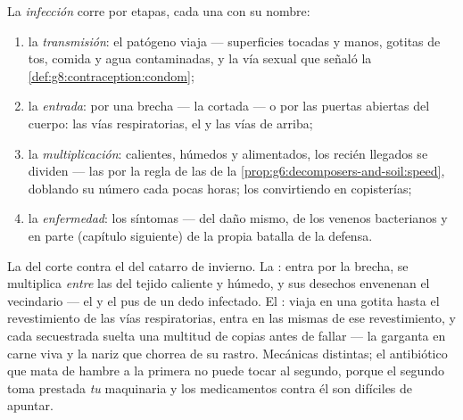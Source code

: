 \begin{definition}\label{def:g9:microbes-and-infection:stages}
La \emph{infección} corre por etapas, cada una con su
nombre:
\begin{enumerate}
  \item la \emph{transmisión}: el patógeno viaja --- superficies
        tocadas y manos, gotitas de tos, comida y agua contaminadas,
         y la vía sexual que señaló la
        \cref{def:g8:contraception:condom};
  \item la \emph{entrada}: por una brecha --- la  cortada --- o por
        las puertas abiertas del cuerpo: las vías respiratorias, el
         y las vías de arriba;
  \item la \emph{multiplicación}: calientes, húmedos y alimentados, los
        recién llegados se dividen --- las  por la regla de
        las  de la
        \cref{prop:g6:decomposers-and-soil:speed}, doblando su número
        cada pocas horas; los  convirtiendo  en
        copisterías;
  \item la \emph{enfermedad}: los síntomas --- del daño mismo, de los
        venenos bacterianos y en parte (capítulo siguiente) de la
        propia batalla de la defensa.
\end{enumerate}
\end{definition}

\begin{example}\label{ex:g9:microbes-and-infection:contrast}
La  del corte contra el  del catarro de invierno. La
: entra por la brecha, se multiplica \emph{entre} las 
del tejido caliente y húmedo, y sus desechos envenenan el vecindario
--- el  y el pus de un dedo infectado. El : viaja en una
gotita hasta el revestimiento de las vías respiratorias, entra en las
 mismas de ese revestimiento, y cada  secuestrada suelta
una multitud de copias antes de fallar --- la garganta en carne viva y
la nariz que chorrea de su rastro. Mecánicas distintas; el antibiótico
que mata de hambre a la primera no puede tocar al segundo, porque el
segundo toma prestada \emph{tu} maquinaria y los medicamentos contra él
son difíciles de apuntar.
\end{example}

